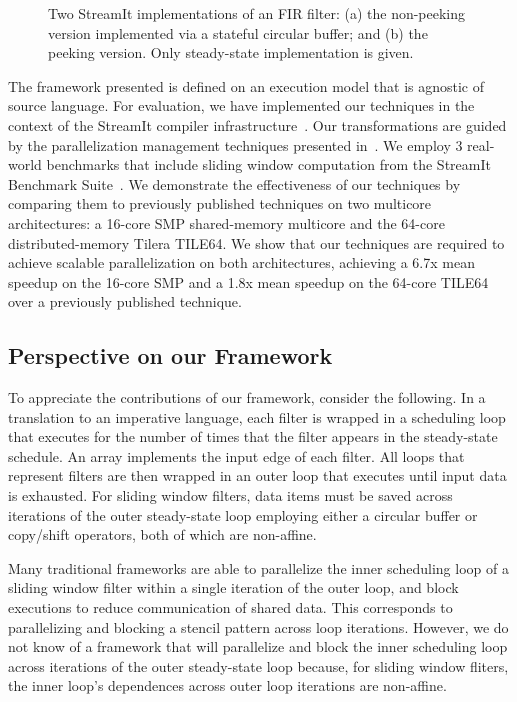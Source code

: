\begin{figure}[t]
\caption[Two implementations of an FIR filter.]{\label{fig:fir-code}
  Two StreamIt implementations of an FIR filter:
   (a) the non-peeking version implemented via a
  stateful circular buffer; and (b) the peeking version. Only steady-state implementation is
  given.}
\vspace{-10pt}
\end{figure}

The framework presented is defined on an execution model that is
agnostic of source language.  For evaluation, we have implemented our
techniques in the context of the StreamIt compiler
infrastructure~\cite{gordon-asplos06}.  Our transformations are guided
by the parallelization management techniques presented
in~\cite{gordon-asplos06}.  We employ 3 real-world benchmarks that
include sliding window computation from the StreamIt Benchmark
Suite~\cite{streamit-suite}.  We demonstrate the effectiveness of our
techniques by comparing them to previously published techniques on two
multicore architectures: a 16-core SMP shared-memory multicore and the
64-core distributed-memory Tilera TILE64.  We show that our techniques
are required to achieve scalable parallelization on both
architectures, achieving a 6.7x mean speedup on the 16-core SMP and a
1.8x mean speedup on the 64-core TILE64 over a
previously published technique.

\subsection{Perspective on our Framework}

To appreciate the contributions of our framework, consider the
following.  In a translation to an imperative language, each filter is
wrapped in a scheduling loop that executes for the number of times
that the filter appears in the steady-state schedule. An array
implements the input edge of each filter.  All loops that represent
filters are then wrapped in an outer loop that executes until input
data is exhausted.  For sliding window filters, data items must be
saved across iterations of the outer steady-state loop employing
either a circular buffer or copy/shift operators, both of which are
non-affine.

Many traditional frameworks are able to parallelize the inner
scheduling loop of a sliding window filter within a single iteration
of the outer loop, and block executions to reduce communication of
shared data.  This corresponds to parallelizing and blocking a stencil
pattern across loop iterations.  However, we do not know of a
framework that will parallelize and block the inner scheduling loop
across iterations of the outer steady-state loop because, for sliding
window fliters, the inner loop's dependences across outer loop
iterations are non-affine.

